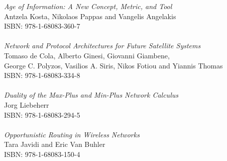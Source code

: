 \vspace{12pt}

\noindent \textit{Age of Information: A New Concept, Metric, and Tool}\\
Antzela Kosta, Nikolaos Pappas and Vangelis Angelakis\\
ISBN: 978-1-68083-360-7\\
\\
\noindent \textit{Network and Protocol Architectures for Future Satellite Systems}\\
Tomaso de Cola, Alberto Ginesi, Giovanni Giambene,\\ George C. Polyzos, Vasilios A. Siris, Nikos Fotiou and Yiannis Thomas\\
ISBN: 978-1-68083-334-8\\
\\
\noindent \textit{Duality of the Max-Plus and Min-Plus Network Calculus}\\
Jorg Liebeherr\\
ISBN: 978-1-68083-294-5\\
\\
\noindent \textit{Opportunistic Routing in Wireless Networks}\\
Tara Javidi and Eric Van Buhler\\
ISBN: 978-1-68083-150-4